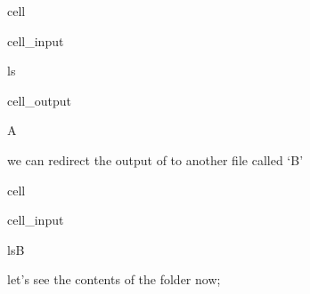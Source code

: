 \documentclass[a4paper,10pt,english]{jupyterBook}
\begin{document}
\begin{sphinxuseclass}{cell}\begin{sphinxVerbatimInput}

\begin{sphinxuseclass}{cell_input}
\begin{sphinxVerbatim}[commandchars=\\\{\}]
ls
\end{sphinxVerbatim}

\end{sphinxuseclass}\end{sphinxVerbatimInput}
\begin{sphinxVerbatimOutput}

\begin{sphinxuseclass}{cell_output}
\begin{sphinxVerbatim}[commandchars=\\\{\}]
A
\end{sphinxVerbatim}

\end{sphinxuseclass}\end{sphinxVerbatimOutput}

\end{sphinxuseclass}
\sphinxAtStartPar
we can redirect the output of  to another file called ‘B’

\begin{sphinxuseclass}{cell}\begin{sphinxVerbatimInput}

\begin{sphinxuseclass}{cell_input}
\begin{sphinxVerbatim}[commandchars=\\\{\}]
ls\PYGZgt{}B
\end{sphinxVerbatim}

\end{sphinxuseclass}\end{sphinxVerbatimInput}

\end{sphinxuseclass}
\sphinxAtStartPar
let’s see the contents of the folder now;
\end{document}
